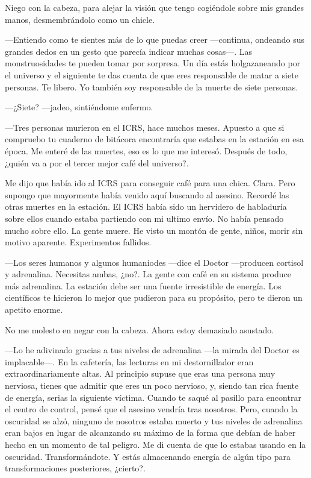 Niego con la cabeza, para alejar la visión que tengo cogiéndole sobre
mis grandes manos, desmembrándolo como un chicle.

---Entiendo como te sientes más de lo que puedas creer ---continua,
ondeando sus grandes dedos en un gesto que parecía indicar muchas
cosas---. Las monstruosidades te pueden tomar por sorpresa. Un día estás
holgazaneando por el universo y el siguiente te das cuenta de que eres
responsable de matar a siete personas. Te libero. Yo también soy
responsable de la muerte de siete personas.

---¿Siete? ---jadeo, sintiéndome enfermo.

---Tres personas murieron en el ICRS, hace muchos meses. Apuesto a que
si compruebo tu cuaderno de bitácora encontraría que estabas en la
estación en esa época. Me enteré de las muertes, eso es lo que me
interesó. Después de todo, ¿quién va a por el tercer mejor café del
universo?.

Me dijo que había ido al ICRS para conseguir café para una
chica. Clara. Pero supongo que mayormente había venido aquí buscando al
asesino. Recordé las otras muertes en la estación. El ICRS había sido un
hervidero de habladuría sobre ellos cuando estaba partiendo con mi
ultimo envío. No había pensado mucho sobre ello. La gente muere. He
visto un montón de gente, niños, morir sin motivo aparente. Experimentos
fallidos.

---Los seres humanos y algunos humaniodes ---dice el Doctor ---producen
cortisol y adrenalina. Necesitas ambas, ¿no?. La gente con café en su
sistema produce más adrenalina. La estación debe ser una fuente
irresistible de energía. Los científicos te hicieron lo mejor que
pudieron para su propósito, pero te dieron un apetito enorme.

No me molesto en negar con la cabeza. Ahora estoy demasiado asustado.

---Lo he adivinado gracias a tus niveles de adrenalina ---la mirada del
Doctor es implacable---. En la cafetería, las lecturas en mi
destornillador eran extraordinariamente altas. Al principio supuse que
eras una persona muy nerviosa, tienes que admitir que eres un poco
nervioso, y, siendo tan rica fuente de energía, serias la siguiente
víctima. Cuando te saqué al pasillo para encontrar el centro de control,
pensé que el asesino vendría tras nosotros. Pero, cuando la oscuridad se
alzó, ninguno de nosotros estaba muerto y tus niveles de adrenalina eran
bajos en lugar de alcanzando su máximo de la forma que debían de haber
hecho en un momento de tal peligro. Me di cuenta de que lo estabas
usando en la oscuridad. Transformándote. Y estás almacenando energía de
algún tipo para transformaciones posteriores, ¿cierto?.

